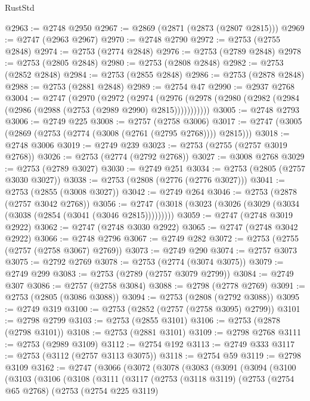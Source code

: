 \begin{lexlean}{RustStd}
\begin{coremodule}
@2963 := @2748 @2950
@2967 := @2869 (@2871 (@2873 (@2807 @2815)))
@2969 := @2747 (@2963 @2967)
@2970 := @2748 @2790
@2972 := @2753 (@2755 @2848)
@2974 := @2753 (@2774 @2848)
@2976 := @2753 (@2789 @2848)
@2978 := @2753 (@2805 @2848)
@2980 := @2753 (@2808 @2848)
@2982 := @2753 (@2852 @2848)
@2984 := @2753 (@2855 @2848)
@2986 := @2753 (@2878 @2848)
@2988 := @2753 (@2881 @2848)
@2989 := @2754 @47
@2990 := @2937 @2768
@3004 := @2747
    (@2970
      (@2972
        (@2974
          (@2976 (@2978 (@2980 (@2982 (@2984 (@2986 (@2988 (@2753 (@2989 @2990) @2815)))))))))))
@3005 := @2748 @2793
@3006 := @2749 @225
@3008 := @2757 (@2758 @3006)
@3017 := @2747 (@3005 (@2869 (@2753 (@2774 (@3008 (@2761 (@2795 @2768)))) @2815)))
@3018 := @2748 @3006
@3019 := @2749 @239
@3023 := @2753 (@2755 (@2757 @3019 @2768))
@3026 := @2753 (@2774 (@2792 @2768))
@3027 := @3008 @2768
@3029 := @2753 (@2789 @3027)
@3030 := @2749 @251
@3034 := @2753 (@2805 (@2757 @3030 @3027))
@3038 := @2753 (@2808 (@2776 (@2776 @3027)))
@3041 := @2753 (@2855 (@3008 @3027))
@3042 := @2749 @264
@3046 := @2753 (@2878 (@2757 @3042 @2768))
@3056 := @2747 (@3018 (@3023 (@3026 (@3029 (@3034 (@3038 (@2854 (@3041 (@3046 @2815)))))))))
@3059 := @2747 (@2748 @3019 @2922)
@3062 := @2747 (@2748 @3030 @2922)
@3065 := @2747 (@2748 @3042 @2922)
@3066 := @2748 @2796
@3067 := @2749 @282
@3072 := @2753 (@2755 (@2757 (@2758 @3067) @2769))
@3073 := @2749 @290
@3074 := @2757 @3073
@3075 := @2792 @2769
@3078 := @2753 (@2774 (@3074 @3075))
@3079 := @2749 @299
@3083 := @2753 (@2789 (@2757 @3079 @2799))
@3084 := @2749 @307
@3086 := @2757 (@2758 @3084)
@3088 := @2798 (@2778 @2769)
@3091 := @2753 (@2805 (@3086 @3088))
@3094 := @2753 (@2808 (@2792 @3088))
@3095 := @2749 @319
@3100 := @2753 (@2852 (@2757 (@2758 @3095) @2799))
@3101 := @2798 @2799
@3103 := @2753 (@2855 @3101)
@3106 := @2753 (@2878 (@2798 @3101))
@3108 := @2753 (@2881 @3101)
@3109 := @2798 @2768
@3111 := @2753 (@2989 @3109)
@3112 := @2754 @192
@3113 := @2749 @333
@3117 := @2753 (@3112 (@2757 @3113 @3075))
@3118 := @2754 @59
@3119 := @2798 @3109
@3162 := @2747
    (@3066
      (@3072
        (@3078
          (@3083
            (@3091
              (@3094
                (@3100
                  (@3103
                    (@3106
                      (@3108
                        (@3111
                          (@3117
                            (@2753
                              (@3118 @3119)
                              (@2753
                                (@2754 @65 @2768)
                                (@2753
                                  (@2754 @225 @3119)

\end{coremodule}
\end{lexlean}
